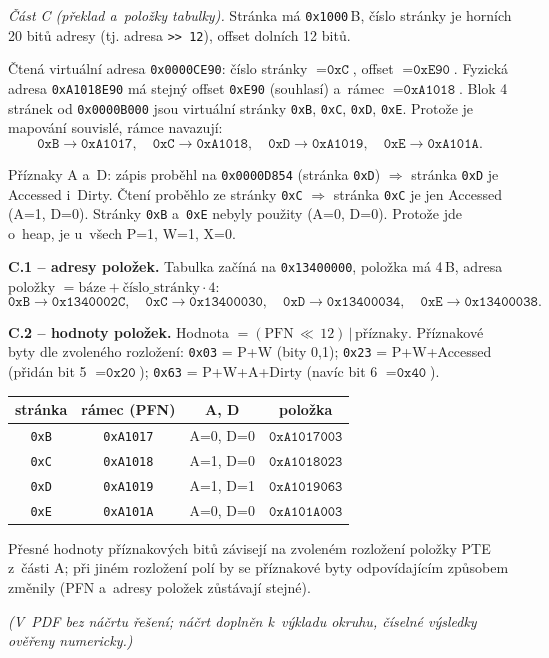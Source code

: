 \medskip
\noindent\textit{Část C (překlad a~položky tabulky).}
Stránka má \texttt{0x1000}\,B, číslo stránky je horních 20 bitů adresy (tj. adresa
\texttt{>> 12}), offset dolních 12 bitů.

Čtená virtuální adresa \texttt{0x0000CE90}: číslo stránky $=\texttt{0xC}$, offset
$=\texttt{0xE90}$. Fyzická adresa \texttt{0xA1018E90} má stejný offset \texttt{0xE90}
(souhlasí) a~rámec $=\texttt{0xA1018}$. Blok 4 stránek od \texttt{0x0000B000} jsou virtuální
stránky \texttt{0xB}, \texttt{0xC}, \texttt{0xD}, \texttt{0xE}. Protože je mapování souvislé,
rámce navazují:
\[
\texttt{0xB}\to\texttt{0xA1017},\quad
\texttt{0xC}\to\texttt{0xA1018},\quad
\texttt{0xD}\to\texttt{0xA1019},\quad
\texttt{0xE}\to\texttt{0xA101A}.
\]

Příznaky A a~D: zápis proběhl na \texttt{0x0000D854} (stránka \texttt{0xD}) $\Rightarrow$
stránka \texttt{0xD} je Accessed i~Dirty. Čtení proběhlo ze stránky \texttt{0xC}
$\Rightarrow$ stránka \texttt{0xC} je jen Accessed (A=1, D=0). Stránky \texttt{0xB}
a~\texttt{0xE} nebyly použity (A=0, D=0). Protože jde o~heap, je u~všech P=1, W=1, X=0.

\smallskip
\noindent\textbf{C.1 -- adresy položek.} Tabulka začíná na \texttt{0x13400000}, položka má
4\,B, adresa položky $=\text{báze}+\text{číslo\_stránky}\cdot 4$:
\[
\texttt{0xB}\!\to\!\boxed{\texttt{0x1340002C}},\quad
\texttt{0xC}\!\to\!\boxed{\texttt{0x13400030}},\quad
\texttt{0xD}\!\to\!\boxed{\texttt{0x13400034}},\quad
\texttt{0xE}\!\to\!\boxed{\texttt{0x13400038}}.
\]

\noindent\textbf{C.2 -- hodnoty položek.} Hodnota $=(\text{PFN}\,{\ll}\,12)\,|\,\text{příznaky}$.
Příznakové byty dle zvoleného rozložení: \texttt{0x03} = P+W (bity 0,1); \texttt{0x23} =
P+W+Accessed (přidán bit 5 $=\texttt{0x20}$); \texttt{0x63} = P+W+A+Dirty (navíc bit 6
$=\texttt{0x40}$).
\begin{center}
\begin{tabular}{|c|c|c|c|}
\hline
\textbf{stránka} & \textbf{rámec (PFN)} & \textbf{A, D} & \textbf{položka} \\
\hline
\texttt{0xB} & \texttt{0xA1017} & A=0, D=0 & $\boxed{\texttt{0xA1017003}}$ \\
\hline
\texttt{0xC} & \texttt{0xA1018} & A=1, D=0 & $\boxed{\texttt{0xA1018023}}$ \\
\hline
\texttt{0xD} & \texttt{0xA1019} & A=1, D=1 & $\boxed{\texttt{0xA1019063}}$ \\
\hline
\texttt{0xE} & \texttt{0xA101A} & A=0, D=0 & $\boxed{\texttt{0xA101A003}}$ \\
\hline
\end{tabular}
\end{center}
Přesné hodnoty příznakových bitů závisejí na zvoleném rozložení položky PTE z~části A;
při jiném rozložení polí by se příznakové byty odpovídajícím způsobem změnily (PFN a~adresy
položek zůstávají stejné).

\medskip
\textit{(V~PDF bez náčrtu řešení; náčrt doplněn k~výkladu okruhu, číselné výsledky ověřeny numericky.)}
